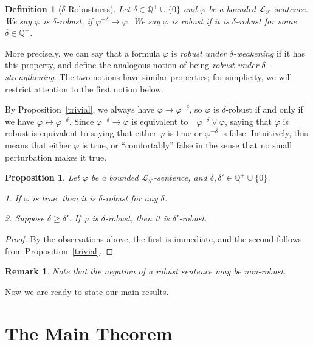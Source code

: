 \documentclass[conference]{IEEEtran}
\newtheorem{proposition}[theorem]{Proposition}
\newtheorem{definition}[theorem]{Definition}
\newtheorem{remark}[theorem]{Remark}
\begin{document}
\begin{definition}[$\delta$-Robustness]\label{rob} Let $\delta\in\mathbb{Q}^+\cup\{0\}$ and $\varphi$ be a bounded $\mathcal{L}_{\mathcal{F}}$-sentence. We say $\varphi$ is $\delta$-robust, if $\varphi^{-\delta}\rightarrow \varphi$. We say $\varphi$ is robust if it is $\delta$-robust for some $\delta\in \mathbb{Q}^+$.
\end{definition} 

More precisely, we can say that a formula $\varphi$ is {\it robust under $\delta$-weakening} if it has this property, and define the analogous notion of being {\it robust under $\delta$-strengthening}. The two notions have similar properties; for simplicity, we will restrict attention to the first notion below.

By Proposition~\ref{trivial}, we always have $\varphi \rightarrow \varphi^{-\delta}$, so $\varphi$ is $\delta$-robust if and only if we have $\varphi \leftrightarrow \varphi^{-\delta}$. Since $\varphi^{-\delta}\rightarrow \varphi$ is equivalent to $\lnot \varphi^{-\delta} \vee \varphi$, saying that $\varphi$ is robust is equivalent to saying that either $\varphi$ is true or $\varphi^{-\delta}$ is false. Intuitively, this means that either $\varphi$ is true, or ``comfortably'' false in the sense that no small perturbation makes it true.

\begin{proposition}\label{true} Let $\varphi$ be a bounded $\mathcal{L}_{\mathcal{F}}$-sentence, and $\delta,\delta'\in \mathbb{Q}^+\cup\{0\}$.

1. If $\varphi$ is true, then it is $\delta$-robust for any $\delta$. 

2. Suppose $\delta\geq\delta'$. If $\varphi$ is $\delta$-robust, then it is $\delta'$-robust. 
\end{proposition}

\begin{proof}
By the observations above, the first is immediate, and the second follows from Proposition~\ref{trivial}. 
\end{proof}

\begin{remark}
Note that the negation of a robust sentence may be non-robust. 
\end{remark}

Now we are ready to state our main results. 

\section{The Main Theorem}\label{mainintro}
\end{document}
